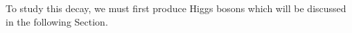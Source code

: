 To study this decay, we must first produce Higgs bosons which will be discussed in the following Section.


